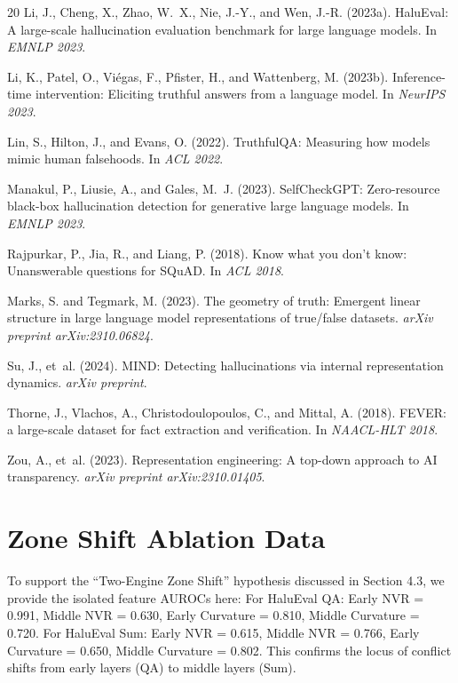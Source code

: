 \documentclass[10pt]{article}
\begin{document}
\begin{thebibliography}{20}
Li, J., Cheng, X., Zhao, W.~X., Nie, J.-Y., and Wen, J.-R. (2023a).
\newblock HaluEval: A large-scale hallucination evaluation benchmark for large language models.
\newblock In \textit{EMNLP 2023}.

Li, K., Patel, O., Vi\'{e}gas, F., Pfister, H., and Wattenberg, M. (2023b).
\newblock Inference-time intervention: Eliciting truthful answers from a language model.
\newblock In \textit{NeurIPS 2023}.

Lin, S., Hilton, J., and Evans, O. (2022).
\newblock TruthfulQA: Measuring how models mimic human falsehoods.
\newblock In \textit{ACL 2022}.

Manakul, P., Liusie, A., and Gales, M.~J. (2023).
\newblock SelfCheckGPT: Zero-resource black-box hallucination detection for generative large language models.
\newblock In \textit{EMNLP 2023}.

Rajpurkar, P., Jia, R., and Liang, P. (2018).
\newblock Know what you don't know: Unanswerable questions for SQuAD.
\newblock In \textit{ACL 2018}.

Marks, S. and Tegmark, M. (2023).
\newblock The geometry of truth: Emergent linear structure in large language model representations of true/false datasets.
\newblock \textit{arXiv preprint arXiv:2310.06824}.

Su, J., et~al. (2024).
\newblock MIND: Detecting hallucinations via internal representation dynamics.
\newblock \textit{arXiv preprint}.

Thorne, J., Vlachos, A., Christodoulopoulos, C., and Mittal, A. (2018).
\newblock FEVER: a large-scale dataset for fact extraction and verification.
\newblock In \textit{NAACL-HLT 2018}.

Zou, A., et~al. (2023).
\newblock Representation engineering: A top-down approach to AI transparency.
\newblock \textit{arXiv preprint arXiv:2310.01405}.

\end{thebibliography}

\appendix

\section{Zone Shift Ablation Data}
\label{sec:appendix-ablation}
To support the ``Two-Engine Zone Shift'' hypothesis discussed in Section 4.3, we provide the isolated feature AUROCs here:
For HaluEval QA: Early NVR = 0.991, Middle NVR = 0.630, Early Curvature = 0.810, Middle Curvature = 0.720.
For HaluEval Sum: Early NVR = 0.615, Middle NVR = 0.766, Early Curvature = 0.650, Middle Curvature = 0.802.
This confirms the locus of conflict shifts from early layers (QA) to middle layers (Sum).
\end{document}
